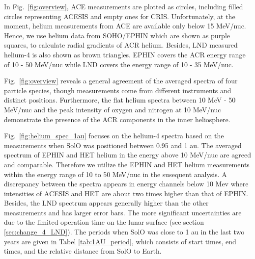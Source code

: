 In Fig.~\ref{fig:overview}, \ac{ACE} measurements are plotted as circles, including filled circles representing \ac{ACESIS} and empty ones for \ac{CRIS}. Unfortunately, at the moment, helium measurements from \ac{ACE} are available only below 15 MeV/nuc. Hence, we use helium data from \ac{SOHO}/\ac{EPHIN} which are shown as purple squares, to calculate radial gradients of \ac{ACR} helium. Besides, \ac{LND} measured helium-4 is also shown as brown triangles. \ac{EPHIN} covers the \ac{ACR} energy range of 10 - 50 MeV/nuc while \ac{LND} covers the energy range of 10 - 35 MeV/nuc.

Fig.~\ref{fig:overview} reveals a general agreement of the averaged spectra of four particle species, though measurements come from different instruments and distinct positions. Furthermore, the flat helium spectra between 10 MeV - 50 MeV/nuc and the peak intensity of oxygen and nitrogen at 10 MeV/nuc demonstrate the presence of the \ac{ACR} components in the inner heliosphere. 

Fig.~\ref{fig:helium_spec_1au} focuses on the helium-4 spectra based on the measurements when \ac{SolO} was positioned between 0.95 and 1 au. 
The averaged spectrum of \ac{EPHIN} and \ac{HET} helium in the energy above 10 MeV/nuc are agreed and comparable. Therefore we utilize the \ac{EPHIN} and \ac{HET} helium measurements within the energy range of 10 to 50 MeV/nuc in the susequent analysis.
A discrepancy between the spectra appears in energy channels below 10 Mev where intensities of \ac{ACESIS} and \ac{HET} are about two times higher than that of \ac{EPHIN}. Besides, the \ac{LND} spectrum appears generally higher than the other measurements and has larger error bars. The more significant uncertainties are due to the limited operation time on the lunar surface (see section \ref{sec:change_4_LND}). The periods when \ac{SolO} was close to 1 au in the last two years are given in Tabel \ref{tab:1AU_period}, which consists of start times, end times, and the relative distance from \ac{SolO} to Earth.



